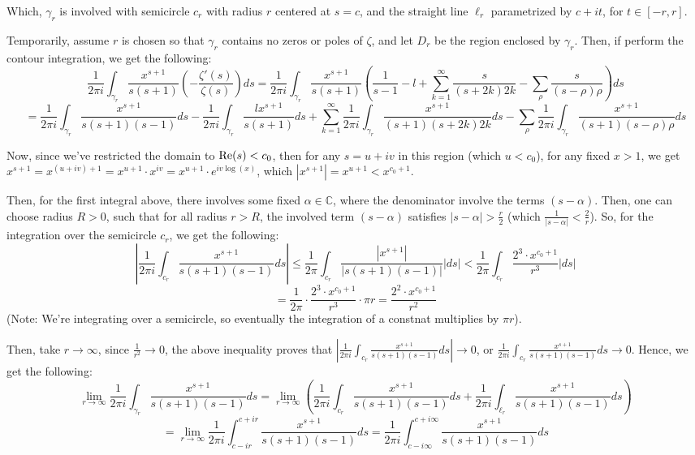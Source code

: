 \documentclass{article}
\begin{document}
Which, $\gamma_r$ is involved with semicircle $c_r$ with radius $r$ centered at $s=c$, and the straight line $\ell_r$ parametrized by $c+it$, for $t\in [-r,r]$.

Temporarily, assume $r$ is chosen so that $\gamma_{r}$ contains no zeros or poles of $\zeta$, and let $D_{r}$ be the region enclosed by $\gamma_{r}$. Then, if perform the contour integration, we get the following:
$$\frac{1}{2\pi i}\int_{\gamma_{r}}\frac{x^{s+1}}{s(s+1)}\left(-\frac{\zeta'(s)}{\zeta(s)}\right)ds = \frac{1}{2\pi i}\int_{\gamma_{r}}\frac{x^{s+1}}{s(s+1)}\left(\frac{1}{s-1}-l+\sum_{k=1}^{\infty}\frac{s}{(s+2k)2k}-\sum_{\rho}\frac{s}{(s-\rho)\rho}\right)ds$$
$$ = \frac{1}{2\pi i}\int_{\gamma_{r}}\frac{x^{s+1}}{s(s+1)(s-1)}ds-\frac{1}{2\pi i}\int_{\gamma_{r}}\frac{lx^{s+1}}{s(s+1)}ds + \sum_{k=1}^{\infty}\frac{1}{2\pi i}\int_{\gamma_{r}}\frac{x^{s+1}}{(s+1)(s+2k)2k}ds - \sum_{\rho}\frac{1}{2\pi i}\int_{\gamma_{r}}\frac{x^{s+1}}{(s+1)(s-\rho)\rho}ds$$

Now, since we've restricted the domain to $\textmd{Re}(s)<c_0$, then for any $s=u+iv$ in this region (which $u<c_0$), for any fixed $x>1$, we get $x^{s+1} = x^{(u+iv)+1} = x^{u+1}\cdot x^{iv} = x^{u+1}\cdot e^{iv\log(x)}$, which $|x^{s+1}| = x^{u+1} < x^{c_0+1}$.

\hfil

Then, for the first integral above, there involves some fixed $\alpha\in \mathbb{C}$, where the denominator involve the terms $(s-\alpha)$. Then, one can choose radius $R>0$, such that for all radius $r>R$, the involved term $(s-\alpha)$ satisfies $|s-\alpha| > \frac{r}{2}$ (which $\frac{1}{|s-\alpha|}<\frac{2}{r}$). So, for the integration over the semicircle $c_r$, we get the following:
$$\left|\frac{1}{2\pi i}\int_{c_{r}}\frac{x^{s+1}}{s(s+1)(s-1)}ds\right| \leq \frac{1}{2\pi}\int_{c_r}\frac{|x^{s+1}|}{|s(s+1)(s-1)|}|ds|< \frac{1}{2\pi}\int_{c_r}\frac{2^3\cdot x^{c_0+1}}{r^3}|ds|$$
$$ = \frac{1}{2\pi}\cdot\frac{2^3\cdot x^{c_0+1}}{r^3}\cdot \pi r = \frac{2^2\cdot x^{c_0+1}}{r^2}$$
(Note: We're integrating over a semicircle, so eventually the integration of a constnat multiplies by $\pi r$).

Then, take $r\rightarrow\infty$, since $\frac{1}{r^2}\rightarrow 0$, the above inequality proves that $\left|\frac{1}{2\pi i}\int_{c_{r}}\frac{x^{s+1}}{s(s+1)(s-1)}ds\right|\rightarrow 0$, or $\frac{1}{2\pi i}\int_{c_{r}}\frac{x^{s+1}}{s(s+1)(s-1)}ds\rightarrow 0$. Hence, we get the following:
$$\lim_{r\rightarrow\infty}\frac{1}{2\pi i}\int_{\gamma_r}\frac{x^{s+1}}{s(s+1)(s-1)}ds = \lim_{r\rightarrow\infty}\left(\frac{1}{2\pi i}\int_{c_r}\frac{x^{s+1}}{s(s+1)(s-1)}ds+\frac{1}{2\pi i}\int_{\ell_r}\frac{x^{s+1}}{s(s+1)(s-1)}ds\right)$$
$$ = \lim_{r\rightarrow\infty}\frac{1}{2\pi i}\int_{c-ir}^{c+ir}\frac{x^{s+1}}{s(s+1)(s-1)}ds = \frac{1}{2\pi i}\int_{c-i\infty}^{c+i\infty}\frac{x^{s+1}}{s(s+1)(s-1)}ds$$
\end{document}
